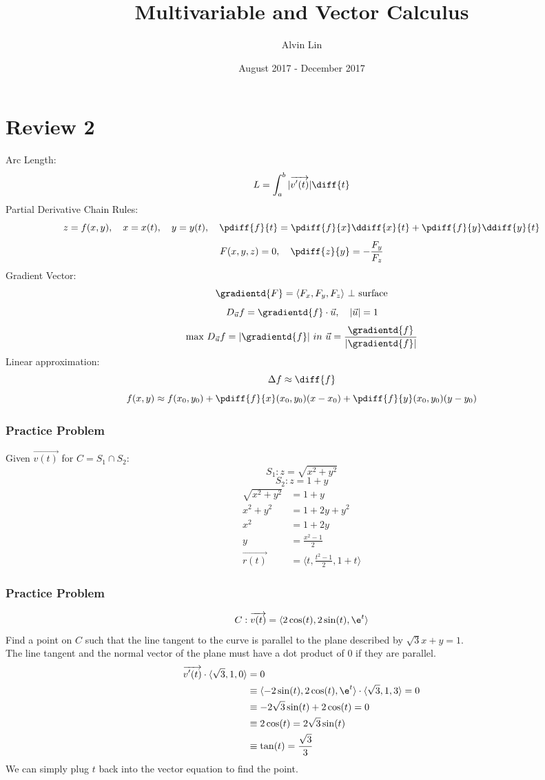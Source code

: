 \documentclass{math}
\title{Multivariable and Vector Calculus}
\author{Alvin Lin}
\date{August 2017 - December 2017}
\begin{document}
\maketitle

\section*{Review 2}
Arc Length:
\[ L = \int_{a}^{b}|\overrightarrow{v'(t)}|\diff{t} \]
Partial Derivative Chain Rules:
\[ z = f(x,y), \quad x = x(t), \quad y = y(t), \quad \pdiff{f}{t} =
  \pdiff{f}{x}\ddiff{x}{t}+ \pdiff{f}{y}\ddiff{y}{t} \]
\[ F(x,y,z) = 0, \quad \pdiff{z}{y} = -\frac{F_y}{F_z} \]
Gradient Vector:
\[ \gradientd{F} = \langle F_x,F_y,F_z\rangle~\bot~\text{surface} \]
\[ D_{\vec{u}}f = \gradientd{f}\cdot\vec{u},\quad |\vec{u}| = 1 \]
\[ \text{max }D_{\vec{u}}f = |\gradientd{f}|~in~\vec{u} =
  \frac{\gradientd{f}}{|\gradientd{f}|} \]
Linear approximation:
\[ \Delta{f} \approx \diff{f} \]
\[ f(x,y) \approx f(x_0,y_0)+\pdiff{f}{x}(x_0,y_0)(x-x_0)+
  \pdiff{f}{y}(x_0,y_0)(y-y_0) \]

\subsubsection*{Practice Problem}
Given \( \overrightarrow{v(t)} \) for \( C = S_1\cap S_2 \):
\[ S_1: z = \sqrt{x^2+y^2} \]
\[ S_2: z = 1+y \]
\begin{align*}
  \sqrt{x^2+y^2} &= 1+y \\
  x^2+y^2 &= 1+2y+y^2 \\
  x^2 &= 1+2y \\
  y &= \frac{x^2-1}{2} \\
  \overrightarrow{r(t)} &= \langle t,\frac{t^2-1}{2},1+t\rangle
\end{align*}

\subsubsection*{Practice Problem}
\[ C: \overrightarrow{v(t)} = \langle2\cos(t),2\sin(t),\e^t\rangle \]
Find a point on \( C \) such that the line tangent to the curve is parallel
to the plane described by \( \sqrt{3}x+y = 1 \). \\
The line tangent and the normal vector of the plane must have a dot product of
0 if they are parallel.
\begin{align*}
  \overrightarrow{v'(t)}\cdot\langle\sqrt{3},1,0\rangle &= 0 \\
  &\equiv \langle-2\sin(t),2\cos(t),\e^t\rangle\cdot
    \langle\sqrt{3},1,3\rangle = 0 \\
  &\equiv -2\sqrt{3}\sin(t)+2\cos(t) = 0 \\
  &\equiv 2\cos(t) = 2\sqrt{3}\sin(t) \\
  &\equiv \tan(t) = \frac{\sqrt{3}}{3}
\end{align*}
We can simply plug \( t \) back into the vector equation to find the point.
\end{document}
